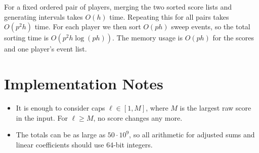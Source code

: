 \documentclass[11pt]{article}
\begin{document}
For a fixed ordered pair of players, merging the two sorted score lists and generating intervals takes
$O(h)$ time. Repeating this for all pairs takes $O(p^2 h)$ time.
For each player we then sort $O(ph)$ sweep events, so the total sorting time is
$O(p^2 h \log(ph))$.
The memory usage is $O(ph)$ for the scores and one player's event list.

\section*{Implementation Notes}

\begin{itemize}[leftmargin=*]
    \item It is enough to consider caps $\ell \in [1, M]$, where $M$ is the largest raw score in the input.
    For $\ell \ge M$, no score changes any more.
    \item The totals can be as large as $50 \cdot 10^9$, so all arithmetic for adjusted sums and linear
    coefficients should use 64-bit integers.
\end{itemize}
\end{document}
